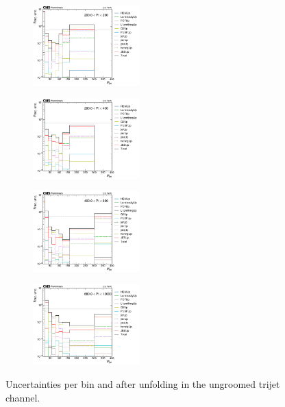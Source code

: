 \begin{figure}[ht!]
  \centering
  \begin{subfigure}
    \centering
    \includegraphics[width=0.45\textwidth]{figures/multijet/unfolding/trijet/unfolded_fracUnc_ungroomed_0.pdf}
\end{subfigure}
  \begin{subfigure}
    \centering
    \includegraphics[width=0.45\textwidth]{figures/multijet/unfolding/trijet/unfolded_fracUnc_ungroomed_1.pdf}
\end{subfigure}
  \begin{subfigure}
    \centering
    \includegraphics[width=0.45\textwidth]{figures/multijet/unfolding/trijet/unfolded_fracUnc_ungroomed_2.pdf}
\end{subfigure}
\begin{subfigure}
    \centering
    \includegraphics[width=0.45\textwidth]{figures/multijet/unfolding/trijet/unfolded_fracUnc_ungroomed_3.pdf}
\end{subfigure}
  \caption{Uncertainties per bin and after unfolding in the ungroomed trijet channel.}
  \label{fig:trijetunc_ungroomed_postunfold}
\end{figure}
